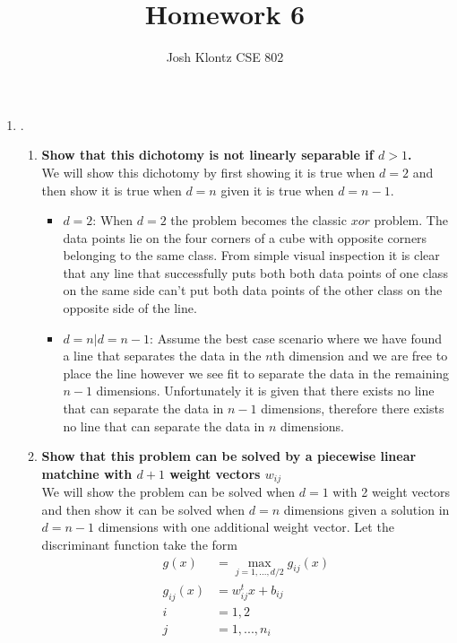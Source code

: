 \documentclass[12pt]{article}
\begin{document}
 
\title{Homework 6}
\author{Josh Klontz
CSE 802}
 
\maketitle

\begin{enumerate}
\item {}. \\
\begin{enumerate}
\item \textbf{Show that this dichotomy is not linearly separable if $d>1$.} \\
We will show this dichotomy by first showing it is true when $d=2$ and then show it is true when $d=n$ given it is true when $d=n-1$.
\begin{itemize}
\item{$d=2$:} When $d=2$ the problem becomes the classic $xor$ problem. The data points lie on the four corners of a cube with opposite corners belonging to the same class. From simple visual inspection it is clear that any line that successfully puts both both data points of one class on the same side can't put both data points of the other class on the opposite side of the line.
\item{$d=n|d=n-1$:} Assume the best case scenario where we have found a line that separates the data in the $n$th dimension and we are free to place the line however we see fit to separate the data in the remaining $n-1$ dimensions. Unfortunately it is given that there exists no line that can separate the data in $n-1$ dimensions, therefore there exists no line that can separate the data in $n$ dimensions.
\end{itemize}
\item \textbf{Show that this problem can be solved by a piecewise linear matchine with $d+1$ weight vectors $w_{ij}$} \\
We will show the problem can be solved when $d=1$ with 2 weight vectors and then show it can be solved when $d=n$ dimensions given a solution in $d=n-1$ dimensions with one additional weight vector.
Let the discriminant function take the form
\begin{equation}
\begin{split}
g(x) &= \max_{j=1,...,d/2}g_{ij}(x) \\
g_{ij}(x) &= w^t_{ij}x+b_{ij} \\
i &= 1,2 \\
j &= 1,...,n_i \\

\end{split}
\end{equation}
\end{enumerate}
\end{enumerate}
\end{document}
